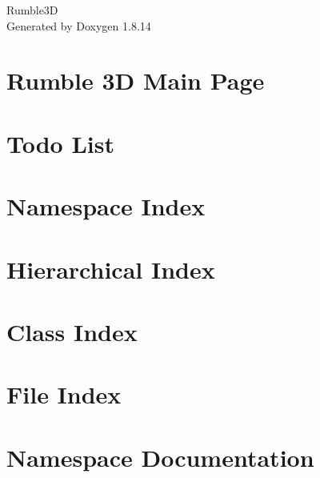 \documentclass[twoside]{book}
\newcommand{\+}{\discretionary{\mbox{\scriptsize$\hookleftarrow$}}{}{}}
\newcommand{\clearemptydoublepage}{%
  \newpage{\pagestyle{empty}\cleardoublepage}%
}
\begin{document}
\hypersetup{pageanchor=false,
             bookmarksnumbered=true,
             pdfencoding=unicode
            }
\begin{titlepage}
\vspace*{7cm}
\begin{center}%
{\Large Rumble3D }\\
\vspace*{1cm}
{\large Generated by Doxygen 1.8.14}\\
\end{center}
\end{titlepage}
\clearemptydoublepage
{}
\tableofcontents
\clearemptydoublepage
{}
\hypersetup{pageanchor=true}

\chapter{Rumble 3D Main Page}
\label{index}\hypertarget{index}{}
\chapter{Todo List}
\label{todo}

\chapter{Namespace Index}

\chapter{Hierarchical Index}

\chapter{Class Index}

\chapter{File Index}

\chapter{Namespace Documentation}

\end{document}
